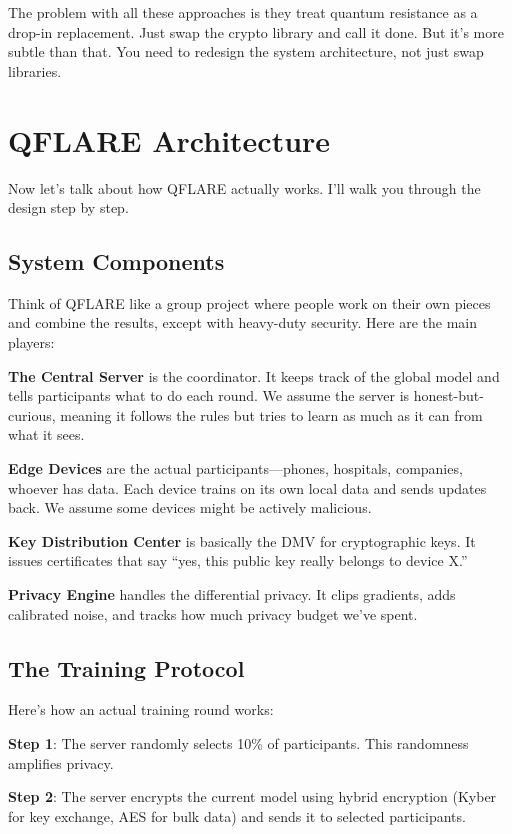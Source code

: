 \documentclass[journal,onecolumn]{IEEEtran}
\begin{document}
The problem with all these approaches is they treat quantum resistance as a drop-in replacement. Just swap the crypto library and call it done. But it's more subtle than that. You need to redesign the system architecture, not just swap libraries.

\section{QFLARE Architecture}
\label{sec:architecture}

Now let's talk about how QFLARE actually works. I'll walk you through the design step by step.

\subsection{System Components}

Think of QFLARE like a group project where people work on their own pieces and combine the results, except with heavy-duty security. Here are the main players:

\textbf{The Central Server} is the coordinator. It keeps track of the global model and tells participants what to do each round. We assume the server is honest-but-curious, meaning it follows the rules but tries to learn as much as it can from what it sees.

\textbf{Edge Devices} are the actual participants---phones, hospitals, companies, whoever has data. Each device trains on its own local data and sends updates back. We assume some devices might be actively malicious.

\textbf{Key Distribution Center} is basically the DMV for cryptographic keys. It issues certificates that say ``yes, this public key really belongs to device X.''

\textbf{Privacy Engine} handles the differential privacy. It clips gradients, adds calibrated noise, and tracks how much privacy budget we've spent.

\subsection{The Training Protocol}

Here's how an actual training round works:

\textbf{Step 1}: The server randomly selects 10\% of participants. This randomness amplifies privacy.

\textbf{Step 2}: The server encrypts the current model using hybrid encryption (Kyber for key exchange, AES for bulk data) and sends it to selected participants.
\end{document}
